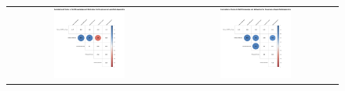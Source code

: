 \begin{figure}[htb]
\begin{tabular}{cc}
 \includegraphics[width=0.45\textwidth]{images/chap-evaluation/corr-signedup-first/non-gamifiedApprentice1.png}&
 \includegraphics[width=0.45\textwidth]{images/chap-evaluation/corr-signedup-first/ont-gamifiedApprentice1.png}
 \end{tabular}
 \fautor
\end{figure}



